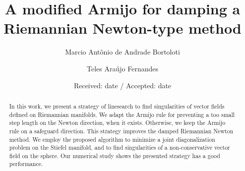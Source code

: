 \newcommand\mycommfont[1]{\footnotesize\ttfamily\textcolor{blue}{#1}}




\title{A modified Armijo for damping a Riemannian Newton-type method}



\author{Marcio Ant\^onio de Andrade Bortoloti         \and
        Teles Ara\'ujo Fernandes %
}





\date{Received: date / Accepted: date}


\maketitle

\begin{abstract}
In this work, we present a strategy of linesearch to find singularities of vector fields defined on Riemannian manifolds. We adapt the Armijo rule for preventing a too small step length on the Newton direction, when it exists. Otherwise, we keep the Armijo rule on a safeguard direction. This strategy improves the damped Riemannian Newton method.
We employ the proposed algorithm to minimize a joint diagonalization problem on the Stiefel manifold, and to find singularities of a non-conservative vector field on the sphere.
Our numerical study shows the presented strategy has a good performance.
\end{abstract}



